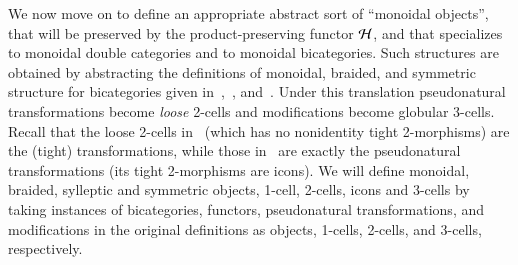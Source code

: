 We now move on to define an appropriate abstract sort of ``monoidal objects'', that will be preserved by the product-preserving functor $\mathcal{H}$, and that specializes to monoidal double categories and to monoidal bicategories. 
Such structures are obtained by abstracting the definitions of monoidal, braided, and symmetric structure for bicategories given in~\cite{nick:tricatsbook},~\cite{mccrudden:bal-coalgb}, and~\cite{gg:ldstr-tricat}. 
Under this translation pseudonatural transformations become \emph{loose} 2-cells and modifications become globular 3-cells.
Recall that the loose 2-cells in \fDblf\ (which has no nonidentity tight 2-morphisms) are the (tight) transformations, while those in \fBicat\ are exactly the pseudonatural transformations (its tight 2-morphisms are icons).
We will define monoidal, braided, sylleptic and symmetric objects, 1-cell, 2-cells, icons and 3-cells by taking instances of bicategories, functors, pseudonatural transformations, and modifications in the original definitions as objects, 1-cells, 2-cells, and 3-cells, respectively. 

